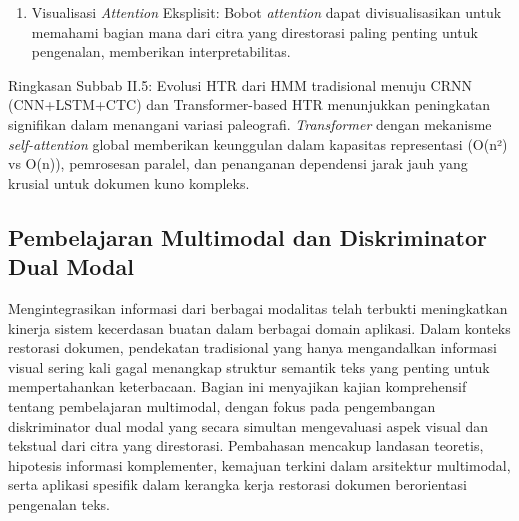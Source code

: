 \begin{enumerate}[leftmargin=*, labelindent=0pt, itemsep=1ex, topsep=0pt]
\begin{enumerate}[leftmargin=1.5em, labelsep=0.5em, itemindent=0pt, label=\alph*., topsep=0pt, parsep=0pt, itemsep=0pt]
      \item Visualisasi \textit{Attention} Eksplisit: \mbox{} Bobot \textit{attention} dapat divisualisasikan untuk memahami bagian mana dari citra yang direstorasi paling penting untuk pengenalan, memberikan interpretabilitas.
\end{enumerate}

\end{enumerate}

Ringkasan Subbab II.5: Evolusi HTR dari HMM tradisional menuju CRNN (CNN+LSTM+CTC) dan Transformer-based HTR menunjukkan peningkatan signifikan dalam menangani variasi paleografi. \textit{Transformer} dengan mekanisme \textit{self-attention} global memberikan keunggulan dalam kapasitas representasi (O(n²) vs O(n)), pemrosesan paralel, dan penanganan dependensi jarak jauh yang krusial untuk dokumen kuno kompleks.


\subsection{Pembelajaran Multimodal dan Diskriminator Dual Modal}
\label{subsec:multi-modal}


Mengintegrasikan informasi dari berbagai modalitas telah terbukti meningkatkan kinerja sistem kecerdasan buatan dalam berbagai domain aplikasi. Dalam konteks restorasi dokumen, pendekatan tradisional yang hanya mengandalkan informasi visual sering kali gagal menangkap struktur semantik teks yang penting untuk mempertahankan keterbacaan. Bagian ini menyajikan kajian komprehensif tentang pembelajaran multimodal, dengan fokus pada pengembangan diskriminator dual modal yang secara simultan mengevaluasi aspek visual dan tekstual dari citra yang direstorasi. Pembahasan mencakup landasan teoretis, hipotesis informasi komplementer, kemajuan terkini dalam arsitektur multimodal, serta aplikasi spesifik dalam kerangka kerja restorasi dokumen berorientasi pengenalan teks.


